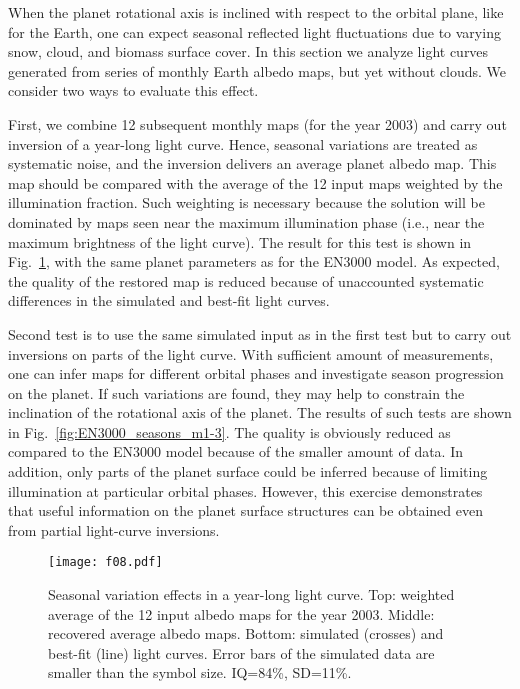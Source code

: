 \documentclass{emulateapj}
\begin{document}
When the planet rotational axis is inclined with respect to the orbital plane,
like for the Earth, one can expect seasonal reflected light fluctuations due to varying
snow, cloud, and biomass surface cover. In this section we analyze 
light curves generated from series of monthly Earth albedo maps, 
but yet without clouds. We consider two ways to evaluate this effect. 

First, we combine 12 subsequent monthly maps (for the year 2003) and carry out inversion 
of a year-long light curve. Hence, seasonal variations are treated as systematic noise, 
and the inversion delivers an average planet albedo map. This map should 
be compared with the average of the 12 input maps weighted by 
the illumination fraction. Such weighting is necessary because the solution will
be dominated by maps seen near the maximum illumination phase (i.e., near the
maximum brightness of the light curve). The result for this test is shown in
Fig.~\ref{fig:EN3000_seasons12m}, with the same planet parameters as for the EN3000 model.
As expected, the quality of the restored map is reduced because of unaccounted systematic
differences in the simulated and best-fit light curves. 

Second test is to use the same simulated input as in the first test but to carry out
inversions on parts of the light curve. With sufficient amount of measurements,
one can infer maps for different orbital phases and investigate season progression
on the planet. If such variations are found, they may help to constrain the inclination
of the rotational axis of the planet. The results of such tests are shown in 
Fig.~\ref{fig:EN3000_seasons_m1-3}. 
The quality is obviously reduced as compared to the EN3000 model because of the smaller
amount of data. In addition, only parts of the planet surface could be inferred 
because of limiting illumination at particular orbital phases. 
However, this exercise demonstrates that useful information on the planet surface structures 
can be obtained even from partial light-curve inversions.

\begin{figure}
\centering
\texttt{[image: f08.pdf]}
\caption{Seasonal variation effects in a year-long light curve. 
Top: weighted average of the 12 input albedo maps for the year 2003. 
Middle: recovered average albedo maps. 
Bottom: simulated (crosses) and best-fit (line) light curves.  
Error bars of the simulated data are smaller than the symbol size.
IQ=84\%, SD=11\%. }
\label{fig:EN3000_seasons12m}
\end{figure}
\end{document}
